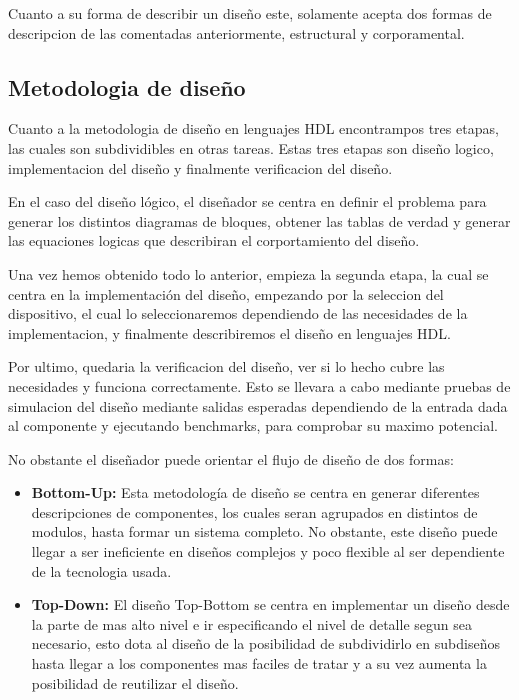 \documentclass[11pt,spanish,listoffigures,listoftables]{tfgetsinf}
\begin{document}
      Cuanto a su forma de describir un diseño este, solamente acepta dos formas
      de descripcion de las comentadas anteriormente, estructural y corporamental.
     
   \subsection {Metodologia de diseño} \label{md_hdl}

      Cuanto a la metodologia de diseño en lenguajes HDL encontrampos tres
      etapas, las cuales son subdividibles en otras tareas. Estas tres etapas
      son diseño logico, implementacion del diseño y finalmente verificacion del
      diseño.

      En el caso del diseño lógico, el diseñador se centra en definir el
      problema para generar los distintos diagramas de bloques, obtener las
      tablas de verdad y generar las equaciones logicas que describiran el
      corportamiento del diseño. 
      
      Una vez hemos obtenido todo lo anterior, empieza la segunda etapa, la cual
      se centra en la implementación del diseño, empezando por la seleccion del
      dispositivo, el cual lo seleccionaremos dependiendo de las necesidades de
      la implementacion, y finalmente describiremos el diseño en lenguajes
      HDL. 

      Por ultimo, quedaria la verificacion del diseño, ver si lo hecho cubre las
      necesidades y funciona correctamente. Esto se llevara a cabo mediante
      pruebas de simulacion del diseño mediante salidas esperadas dependiendo de
      la entrada dada al componente y ejecutando benchmarks, para comprobar su
      maximo potencial.  

      No obstante el diseñador puede orientar el flujo de diseño de dos formas:
      \begin{itemize}
         \item \textbf{Bottom-Up: } Esta metodología de diseño se centra en
         generar diferentes descripciones de componentes, los cuales seran
         agrupados en distintos de modulos, hasta formar un sistema completo. No
         obstante, este diseño puede llegar a ser ineficiente en diseños
         complejos y poco flexible al ser dependiente de la tecnologia usada.

         \item \textbf{Top-Down: } El diseño Top-Bottom se centra en implementar
         un diseño desde la parte de mas alto nivel e ir especificando el nivel
         de detalle segun sea necesario, esto dota al diseño de la posibilidad
         de subdividirlo en subdiseños hasta llegar a los componentes mas
         faciles de tratar y a su vez aumenta la posibilidad de reutilizar el diseño.
      \end{itemize}
\end{document}
